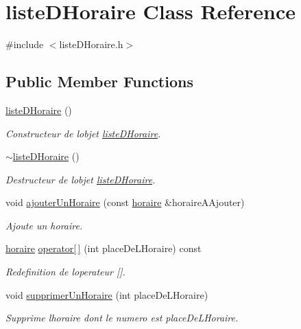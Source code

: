 \hypertarget{classliste_d_horaire}{}\section{liste\+D\+Horaire Class Reference}
\label{classliste_d_horaire}


{\ttfamily \#include $<$liste\+D\+Horaire.\+h$>$}

\subsection*{Public Member Functions}
\begin{DoxyCompactItemize}
\item 
\hyperlink{classliste_d_horaire_a614fd89aa8fb95f9068613fc1974f307}{liste\+D\+Horaire} ()
\begin{DoxyCompactList}\small\item\em Constructeur de l\textquotesingle{}objet \hyperlink{classliste_d_horaire}{liste\+D\+Horaire}. \end{DoxyCompactList}\item 
\hyperlink{classliste_d_horaire_a497a28a7b80534317d7ec387d4c8714b}{$\sim$liste\+D\+Horaire} ()
\begin{DoxyCompactList}\small\item\em Destructeur de l\textquotesingle{}objet \hyperlink{classliste_d_horaire}{liste\+D\+Horaire}. \end{DoxyCompactList}\item 
void \hyperlink{classliste_d_horaire_a30f35985eb14300ad9cf8f44ef9d651e}{ajouter\+Un\+Horaire} (const \hyperlink{classhoraire}{horaire} \&horaire\+A\+Ajouter)
\begin{DoxyCompactList}\small\item\em Ajoute un horaire. \end{DoxyCompactList}\item 
\hyperlink{classhoraire}{horaire} \hyperlink{classliste_d_horaire_a23b08c00c1d32405bd84045ca9b6208a}{operator\mbox{[}$\,$\mbox{]}} (int place\+De\+L\+Horaire) const
\begin{DoxyCompactList}\small\item\em Redefinition de l\textquotesingle{}operateur \mbox{[}\mbox{]}. \end{DoxyCompactList}\item 
void \hyperlink{classliste_d_horaire_ad7e5d53b1c64285c908f9fe2e60aa61f}{supprimer\+Un\+Horaire} (int place\+De\+L\+Horaire)
\begin{DoxyCompactList}\small\item\em Supprime l\textquotesingle{}horaire dont le numero est place\+De\+L\+Horaire. \end{DoxyCompactList}\end{DoxyCompactItemize}



